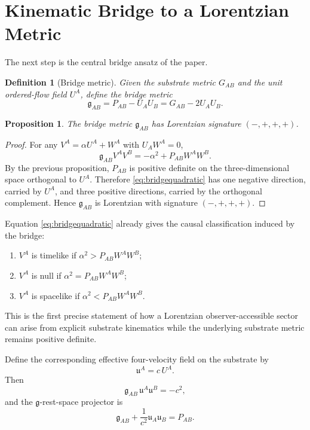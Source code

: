 \documentclass[11pt]{article}
\newcommand{\BridgeMetric}{\mathfrak{g}}
\newtheorem{definition}{Definition}
\newtheorem{proposition}{Proposition}
\begin{document}
\section{Kinematic Bridge to a Lorentzian Metric}

The next step is the central bridge ansatz of the paper.

\begin{definition}[Bridge metric]
Given the substrate metric \(G_{AB}\) and the unit ordered-flow field \(U^A\), define the bridge metric
\begin{equation}
\BridgeMetric_{AB}
=
P_{AB} - U_A U_B
=
G_{AB} - 2 U_A U_B.
\label{eq:bridgemetric}
\end{equation}
\end{definition}

\begin{proposition}
The bridge metric \(\BridgeMetric_{AB}\) has Lorentzian signature \((-,+,+,+)\).
\end{proposition}

\begin{proof}
For any \(V^A = \alpha U^A + W^A\) with \(U_AW^A=0\),
\begin{equation}
\BridgeMetric_{AB} V^A V^B
=
-\alpha^2 + P_{AB} W^A W^B.
\label{eq:bridgequadratic}
\end{equation}
By the previous proposition, \(P_{AB}\) is positive definite on the three-dimensional space orthogonal to \(U^A\). Therefore \eqref{eq:bridgequadratic} has one negative direction, carried by \(U^A\), and three positive directions, carried by the orthogonal complement. Hence \(\BridgeMetric_{AB}\) is Lorentzian with signature \((-,+,+,+)\).
\end{proof}

Equation \eqref{eq:bridgequadratic} already gives the causal classification induced by the bridge:
\begin{enumerate}
    \item \(V^A\) is timelike if \(\alpha^2 > P_{AB}W^A W^B\);
    \item \(V^A\) is null if \(\alpha^2 = P_{AB}W^A W^B\);
    \item \(V^A\) is spacelike if \(\alpha^2 < P_{AB}W^A W^B\).
\end{enumerate}
This is the first precise statement of how a Lorentzian observer-accessible sector can arise from explicit substrate kinematics while the underlying substrate metric remains positive definite.

Define the corresponding effective four-velocity field on the substrate by
\begin{equation}
\mathfrak u^A = c\, U^A.
\label{eq:substratefourvelocity}
\end{equation}
Then
\begin{equation}
\BridgeMetric_{AB}\,\mathfrak u^A \mathfrak u^B = -c^2,
\label{eq:bridgenorm}
\end{equation}
and the \(\BridgeMetric\)-rest-space projector is
\begin{equation}
\BridgeMetric_{AB}
+
\frac{1}{c^2}\mathfrak u_A \mathfrak u_B
=
P_{AB}.
\label{eq:bridgeprojector}
\end{equation}
\end{document}
